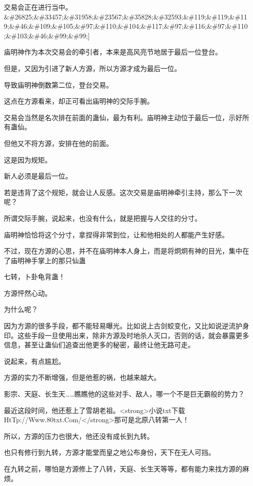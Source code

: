 
\begin{this_body}

交易会正在进行当中。\&\#26825;\&\#33457;\&\#31958;\&\#23567;\&\#35828;\&\#32593;\&\#119;\&\#119;\&\#119;\&\#46;\&\#109;\&\#105;\&\#97;\&\#110;\&\#104;\&\#117;\&\#97;\&\#116;\&\#97;\&\#110;\&\#103;\&\#46;\&\#99;\&\#99;]

庙明神作为本次交易会的牵引者，本来是高风亮节地居于最后一位登台。

但是，又因为引进了新人方源，所以方源才成为最后一位。

导致庙明神倒数第二位，登台交易。

这点在方源看来，却正可看出庙明神的交际手腕。

交易会当然是名次排在前面的蛊仙，最为有利。庙明神主动位于最后一位，示好所有蛊仙。

但他又不将方源，安排在他的前面。

这是因为规矩。

新人必须是最后一位。

若是违背了这个规矩，就会让人反感。这次交易是庙明神牵引主持，那么下一次呢？

所谓交际手腕，说起来，也没有什么，就是把握与人交往的分寸。

庙明神恰恰将这个分寸，拿捏得非常到位，让和他相处的人都能产生好感。

不过，现在方源的心思，并不在庙明神本人身上，而是将炯炯有神的目光，集中在了庙明神手掌上的那只仙蛊

七转，卜卦龟背蛊！

方源怦然心动。

为什么呢？

因为方源的很多手段，都不能轻易曝光。比如说上古剑蛟变化，又比如说逆流护身印。这些手段一旦使用出来，除非方源及时地杀人灭口，否则的话，就会暴露更多信息，甚至让蛊仙们追查出他更多的秘密，最终让他无路可走。

说起来，有点尴尬。

方源的实力不断增强，但是他惹的祸，也越来越大。

影宗、天庭、长生天……瞧瞧他的这些对手、敌人，哪一个不是巨无霸般的势力？

最近这段时间，他还惹上了雪胡老祖。<strong>小说txt下载HtTp://Www.80txt.Com/</strong>那可是北原八转第一人！

所以，方源的压力也很大，他还没有成长到九转。

也只有修行到九转，方源才能堂而皇之地公布身份，天下在无人可挡。

在九转之前，哪怕是方源修上了八转，天庭、长生天等等，都有能力来找方源的麻烦。


\end{this_body}
